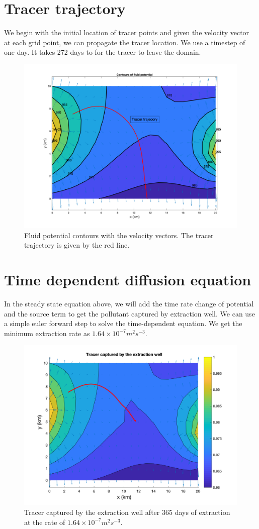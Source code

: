\documentclass{article}
\begin{document}
\newpage
\section{Tracer trajectory}

We begin with the initial location of tracer points and given the velocity vector at each grid point, we can propagate the tracer location. We use a timestep of one day. It takes 272 days to for the tracer to leave the domain.
\begin{figure}
    \centering
    \includegraphics[scale=0.4]{2.png}
    \caption{Fluid potential contours with the velocity vectors. The tracer trajectory is given by the red line.}
\end{figure}

\section{Time dependent diffusion equation}

In the steady state equation above, we will add the time rate change of potential and the source term to get the pollutant captured by extraction well. We can use a simple euler forward step to solve the time-dependent equation. We get the minimum extraction rate as $1.64\times10^{-7} m^2s^{-3}$. 

\begin{figure}
    \centering
    \includegraphics[scale=0.6]{4.png}
    \caption{Tracer captured by the extraction well after 365 days of extraction at the rate of $1.64\times10^{-7} m^2s^{-3}$.}
\end{figure}
\end{document}

